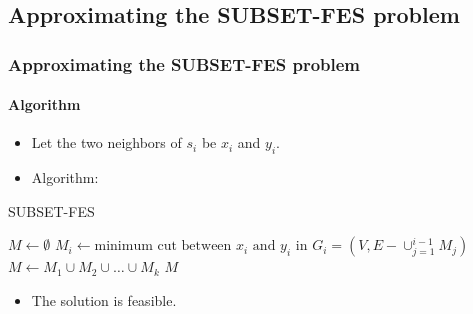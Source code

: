 \documentclass[10pt]{beamer}
\begin{document}
\subsection{Approximating the SUBSET-FES problem}
\begin{frame}
    \frametitle{Approximating the SUBSET-FES problem}
    \framesubtitle{Algorithm}
    \begin{itemize}
        \item Let the two neighbors of \(s_i\) be \(x_i\) and \(y_i\).
        \item Algorithm:
    \end{itemize}
    \begin{algorithm}[H]
        \caption{SUBSET-FES}
        \begin{algorithmic}
            \State $M \leftarrow \emptyset$
                \State $M_i \leftarrow \text{minimum cut between \(x_i\) and \(y_i\) in } G_i = (V, E - \cup_{j=1}^{i-1}M_j)$
            \EndFor
            \State $M \leftarrow M_1 \cup M_2 \cup \ldots \cup M_k$
            \State \Return $M$
        \end{algorithmic}
    \end{algorithm}
    \begin{itemize}
        \item The solution is feasible.
    \end{itemize}
\end{frame}
\end{document}
